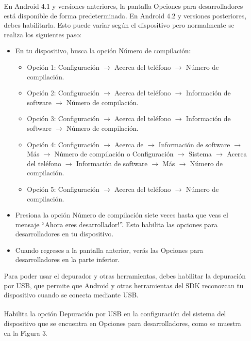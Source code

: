 \documentclass[a4paper,10pt, oneside, titlepage]{article}
\begin{document}
	En Android 4.1 y versiones anteriores, la pantalla Opciones para desarrolladores está disponible de forma predeterminada. En Android 4.2 y versiones posteriores, debes habilitarla. Esto puede variar según el dispositivo pero normalmente se realiza los siguientes paso:
	\begin{itemize}
		\item En tu dispositivo, busca la opción Número de compilación:
		\begin{itemize}
			\item Opción 1: Configuración $\rightarrow$ Acerca del teléfono $\rightarrow$ Número de compilación.
			\item Opción 2: Configuración $\rightarrow$ Acerca del teléfono $\rightarrow$ Información de software $\rightarrow$ Número de compilación.
			\item Opción 3: Configuración $\rightarrow$ Acerca del teléfono $\rightarrow$ Información de software $\rightarrow$ Número de compilación.
			\item Opción 4: Configuración $\rightarrow$ Acerca de $\rightarrow$ Información de software $\rightarrow$ Más $\rightarrow$ Número de compilación o Configuración $\rightarrow$ Sistema $\rightarrow$ Acerca del teléfono $\rightarrow$ Información de software $\rightarrow$ Más $\rightarrow$ Número de compilación.
			\item Opción 5: Configuración $\rightarrow$ Acerca del teléfono $\rightarrow$ Número de compilación.
		\end{itemize}
		\item Presiona la opción Número de compilación siete veces hasta que veas el mensaje ``Ahora eres desarrollador!''. Esto habilita las opciones para desarrolladores en tu dispositivo.
		\item Cuando regreses a la pantalla anterior, verás las Opciones para desarrolladores en la parte inferior.
	\end{itemize}
	Para poder usar el depurador y otras herramientas, debes habilitar la depuración por USB, que permite que Android y otras herramientas del SDK reconozcan tu dispositivo cuando se conecta mediante USB.\\\\
	Habilita la opción Depuración por USB en la configuración del sistema del dispositivo que se encuentra en Opciones para desarrolladores, como se muestra en la Figura 3.
\end{document}
